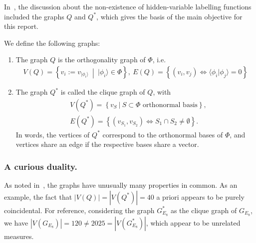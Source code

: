 In~\cite{ZIMBA1993697}, the discussion about the non-existence of 
hidden-variable labelling functions included the graphs $Q$ and $Q^*$,
which gives the basis of the main objective for this report.
\begin{definition}
    We define the following graphs:
    \begin{enumerate}
        \item The graph $Q$ is the orthogonality graph of $\Phi$, i.e. 
            \begin{align*}
                V(Q) = \left\{ v_i := v_{|\phi_i \rangle}~\middle|~|\phi_i \rangle \in \Phi \right\},~E(Q) = \left\{ (v_i, v_j) \iff \langle \phi_i | \phi_j \rangle = 0 \right\}
            \end{align*}

        \item The graph $Q^*$ is called the clique graph of $Q$, with
            \begin{align*}
                &V(Q^*) = \left\{ v_S~|~S \subset \Phi \textrm{ orthonormal basis} \right\}, \\
                &E(Q^*) = \left\{ (v_{S_1}, v_{S_2}) \iff S_1 \cap S_2 \neq \emptyset \right\}.
            \end{align*}
            In words, the vertices of $Q^*$ correspond to the orthonormal bases of $\Phi$,
            and vertices share an edge if the respective bases share a vector.
    \end{enumerate}
\end{definition}

\subsubsection{A curious duality.}
As noted in~\cite{ZIMBA1993697}, the graphs have unusually many properties in common.
As an example, the fact that $|V(Q)| = |V(Q^*)| = 40$ a priori appears to be purely coincidental.
For reference, considering the graph $G_{E_8}^*$ as the clique graph of $G_{E_8}$,
we have $|V(G_{E_8})| = 120 \neq 2025 = |V(G_{E_8}^*)|$, which appear to be 
unrelated measures.

